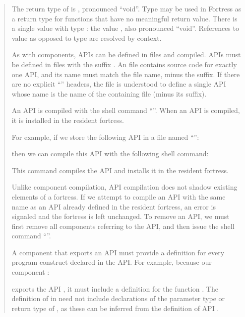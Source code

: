 \begin{description}
\begin{quote}
The return type of  is \EXP{()}, pronounced ``void''.
Type \EXP{()} may be used in Fortress as a return type
for functions that have no meaningful return value.
There is a single value with type \EXP{()}:
the value \EXP{()}, also pronounced ``void''.
References to value \EXP{()} as opposed
to type \EXP{()} are resolved by context.

As with components, APIs can be defined in files and compiled. APIs
must be defined in files with the suffix .
An  file contains
source code for exactly one API, and its name must match the file name,
minus the suffix.
If there are  no explicit ``''
headers, the file is understood to define a single API whose name is
the name of the containing file (minus its suffix).

An API is compiled with the shell command ``''.
When an API is compiled,
it is installed in the resident fortress.


For example, if we store
the following API in a file named ``'':

then we can compile this API with the following shell command:


This command compiles the API 
and installs it in the resident fortress.



Unlike component compilation, API compilation does not shadow
existing elements of a fortress.
If we attempt to compile an API with the same name as an API
already defined
in the resident fortress, an error is signaled
and the fortress is left unchanged. To remove an API, we must
first remove all components referring to the API,
and then issue the shell command ``''.


A component that exports an API must provide a definition
for every program construct declared in the API. For example, because
our component :

exports the API , it must include a definition for the
function .
The definition of  in  need not include
declarations of the
parameter type or return type of , as these can be inferred
from the
definition of API .


\end{quote}
\end{description}

